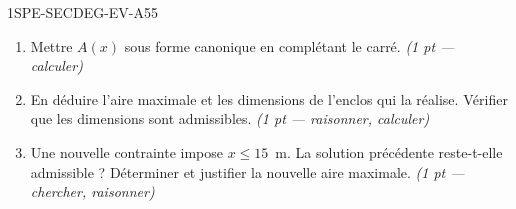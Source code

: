 \begin{evaluation}{1SPE-SECDEG-EV-A}{55}
\begin{enumerate}
  \item Mettre $A(x)$ sous forme canonique en complétant le carré.
  \hfill\textit{(1 pt — calculer)}

  \item En déduire l'aire maximale et les dimensions de l'enclos qui la réalise.
  Vérifier que les dimensions sont admissibles.
  \hfill\textit{(1 pt — raisonner, calculer)}

  \item Une nouvelle contrainte impose $x\leq15$~m. La solution précédente
  reste-t-elle admissible ? Déterminer et justifier la nouvelle aire maximale.
  \hfill\textit{(1 pt — chercher, raisonner)}
\end{enumerate}

\end{evaluation}
